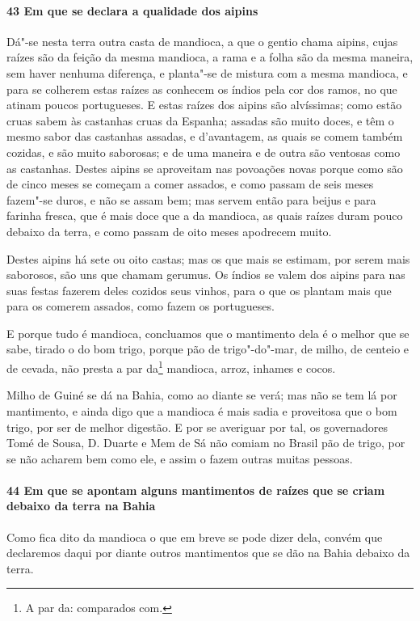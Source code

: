 \begin{linenumbers}
\paragraph{43 Em que se declara a qualidade dos aipins}\quad
Dá"-se nesta terra outra casta de mandioca, a que o gentio chama aipins, cujas raízes são
da feição da mesma mandioca, a rama e a folha são da mesma maneira, sem haver nenhuma
diferença, e planta"-se de mistura com a mesma mandioca, e para se colherem estas raízes as
conhecem os índios pela cor dos ramos, no que atinam poucos portugueses. E estas raízes
dos aipins são alvíssimas; como estão cruas sabem às castanhas cruas da Espanha; assadas
são muito doces, e têm o mesmo sabor das castanhas assadas, e d'avantagem, as quais se
comem também cozidas, e são muito saborosas; e de uma maneira e de outra são ventosas como
as castanhas. Destes aipins se aproveitam nas povoações novas porque como são de cinco
meses se começam a comer assados, e como passam de seis meses fazem"-se duros, e não se
assam bem; mas servem então para beijus e para farinha fresca, que é mais doce que a da
mandioca, as quais raízes duram pouco debaixo da terra, e como passam de oito meses
apodrecem muito.

Destes aipins há sete ou oito castas; mas os que mais se estimam, por serem mais
saborosos, são uns que chamam gerumus. Os índios se valem dos aipins para nas suas festas
fazerem deles cozidos seus vinhos, para o que os plantam mais que para os comerem assados,
como fazem os portugueses.

E porque tudo é mandioca, concluamos que o mantimento dela é o melhor que se sabe, tirado
o do bom trigo, porque pão de trigo"-do"-mar, de milho, de centeio e de cevada, não presta a
par da\footnote{ A par da: comparados com.} mandioca, arroz, inhames e cocos.

Milho de Guiné se dá na Bahia, como ao diante se verá; mas não se tem lá por mantimento, e
ainda digo que a mandioca é mais sadia e proveitosa que o bom trigo, por ser de melhor
digestão. E por se averiguar por tal, os governadores Tomé de Sousa, D. Duarte e Mem de Sá
não comiam no Brasil pão de trigo, por se não acharem bem como ele, e assim o fazem outras
muitas pessoas.

\paragraph{44 Em que se apontam alguns mantimentos de raízes que se criam debaixo da terra
na Bahia}\quad
Como fica dito da mandioca o que em breve se pode dizer dela, convém que declaremos daqui
por diante outros mantimentos que se dão na Bahia debaixo da terra.


\end{linenumbers}
